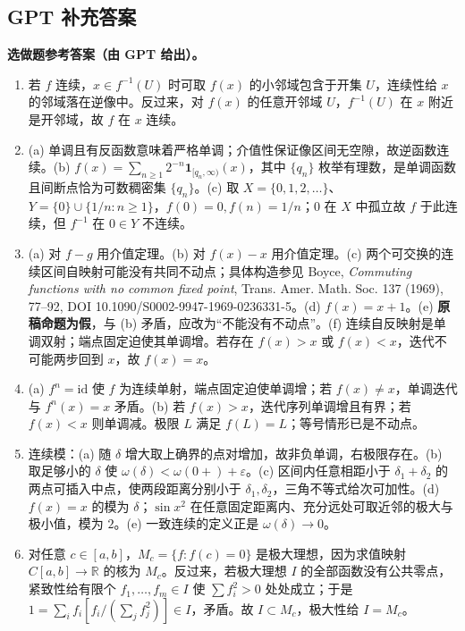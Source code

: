 \documentclass[UTF8,11pt, a4paper, oneside, fontset=none]{ctexbook}
\begin{document}
\clearpage

\subsection*{GPT 补充答案}

\noindent\textbf{选做题参考答案（由 GPT 给出）。}
\begin{enumerate}
\item 若 $f$ 连续，$x\in f^{-1}(U)$ 时可取 $f(x)$ 的小邻域包含于开集 $U$，连续性给 $x$ 的邻域落在逆像中。反过来，对 $f(x)$ 的任意开邻域 $U$，$f^{-1}(U)$ 在 $x$ 附近是开邻域，故 $f$ 在 $x$ 连续。
\item (a) 单调且有反函数意味着严格单调；介值性保证像区间无空隙，故逆函数连续。(b) $f(x)=\sum_{n\ge1}2^{-n}\mathbf1_{[q_n,\infty)}(x)$，其中 $\{q_n\}$ 枚举有理数，是单调函数且间断点恰为可数稠密集 $\{q_n\}$。(c) 取 $X=\{0,1,2,\ldots\}$、$Y=\{0\}\cup\{1/n:n\ge1\}$，$f(0)=0,f(n)=1/n$；$0$ 在 $X$ 中孤立故 $f$ 于此连续，但 $f^{-1}$ 在 $0\in Y$ 不连续。
\item (a) 对 $f-g$ 用介值定理。(b) 对 $f(x)-x$ 用介值定理。(c) 两个可交换的连续区间自映射可能没有共同不动点；具体构造参见 Boyce, \emph{Commuting functions with no common fixed point}, Trans. Amer. Math. Soc. 137 (1969), 77--92, DOI 10.1090/S0002-9947-1969-0236331-5。(d) $f(x)=x+1$。(e) \textbf{原稿命题为假}，与 (b) 矛盾，应改为“不能没有不动点”。(f) 连续自反映射是单调双射；端点固定迫使其单调增。若存在 $f(x)>x$ 或 $f(x)<x$，迭代不可能两步回到 $x$，故 $f(x)=x$。
\item (a) $f^n=\mathrm{id}$ 使 $f$ 为连续单射，端点固定迫使单调增；若 $f(x)\ne x$，单调迭代与 $f^n(x)=x$ 矛盾。(b) 若 $f(x)>x$，迭代序列单调增且有界；若 $f(x)<x$ 则单调减。极限 $L$ 满足 $f(L)=L$；等号情形已是不动点。
\item 连续模：(a) 随 $\delta$ 增大取上确界的点对增加，故非负单调，右极限存在。(b) 取足够小的 $\delta$ 使 $\omega(\delta)<\omega(0+)+\varepsilon$。(c) 区间内任意相距小于 $\delta_1+\delta_2$ 的两点可插入中点，使两段距离分别小于 $\delta_1,\delta_2$，三角不等式给次可加性。(d) $f(x)=x$ 的模为 $\delta$；$\sin x^2$ 在任意固定距离内、充分远处可取近邻的极大与极小值，模为 $2$。(e) 一致连续的定义正是 $\omega(\delta)\to0$。
\item 对任意 $c\in[a,b]$，$M_c=\{f:f(c)=0\}$ 是极大理想，因为求值映射 $C[a,b]\to\mathbb R$ 的核为 $M_c$。反过来，若极大理想 $I$ 的全部函数没有公共零点，紧致性给有限个 $f_1,\ldots,f_m\in I$ 使 $\sum f_i^2>0$ 处处成立；于是 $1=\sum_i f_i[f_i/(\sum_jf_j^2)]\in I$，矛盾。故 $I\subset M_c$，极大性给 $I=M_c$。
\end{enumerate}
\end{document}
